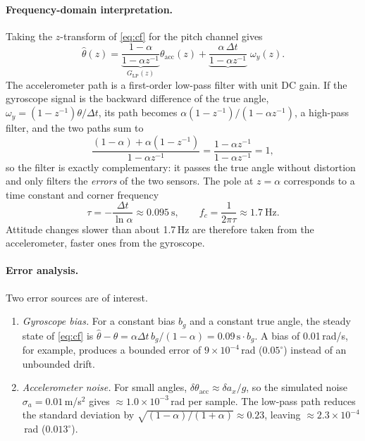 \documentclass[11pt,a4paper]{article}
\begin{document}
\paragraph{Frequency-domain interpretation.} Taking the $z$-transform of \eqref{eq:cf} for the pitch channel gives
\begin{equation}
\hat\theta(z)=\underbrace{\frac{1-\alpha}{1-\alpha z^{-1}}}_{G_{\mathrm{LP}}(z)}\theta_{\mathrm{acc}}(z)
+\underbrace{\frac{\alpha\,\Delta t}{1-\alpha z^{-1}}}_{}\;\omega_y(z).
\end{equation}
The accelerometer path is a first-order low-pass filter with unit DC gain. If the gyroscope signal is the backward difference of the true angle, $\omega_y=(1-z^{-1})\theta/\Delta t$, its path becomes $\alpha(1-z^{-1})/(1-\alpha z^{-1})$, a high-pass filter, and the two paths sum to
\[
\frac{(1-\alpha)+\alpha(1-z^{-1})}{1-\alpha z^{-1}}=\frac{1-\alpha z^{-1}}{1-\alpha z^{-1}}=1,
\]
so the filter is exactly complementary: it passes the true angle without distortion and only filters the \emph{errors} of the two sensors. The pole at $z=\alpha$ corresponds to a time constant and corner frequency
\begin{equation}
\tau=-\frac{\Delta t}{\ln\alpha}\approx0.095\ \mathrm{s},\qquad f_c=\frac{1}{2\pi\tau}\approx1.7\ \mathrm{Hz}.
\end{equation}
Attitude changes slower than about 1.7\,Hz are therefore taken from the accelerometer, faster ones from the gyroscope.
 
\paragraph{Error analysis.} Two error sources are of interest.
\begin{enumerate}
  \item \emph{Gyroscope bias.} For a constant bias $b_g$ and a constant true angle, the steady state of \eqref{eq:cf} is $\hat\theta-\theta=\alpha\Delta t\,b_g/(1-\alpha)=0.09\,\mathrm{s}\cdot b_g$. A bias of 0.01\,rad/s, for example, produces a bounded error of $9\times10^{-4}$\,rad ($0.05^\circ$) instead of an unbounded drift.
  \item \emph{Accelerometer noise.} For small angles, $\delta\theta_{\mathrm{acc}}\approx\delta a_x/g$, so the simulated noise $\sigma_a=0.01$\,m/s$^2$ gives $\approx1.0\times10^{-3}$\,rad per sample. The low-pass path reduces the standard deviation by $\sqrt{(1-\alpha)/(1+\alpha)}\approx0.23$, leaving $\approx2.3\times10^{-4}$\,rad ($0.013^\circ$).
\end{enumerate}
 
\end{document}
